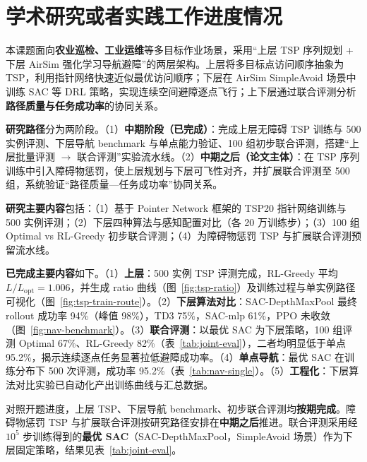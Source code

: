 
\section{学术研究或者实践工作进度情况}

本课题面向\textbf{农业巡检、工业运维}等多目标作业场景，采用``上层 TSP 序列规划 + 下层 AirSim 强化学习导航避障''的两层架构。上层将多目标点访问顺序抽象为 TSP，利用指针网络快速近似最优访问顺序；下层在 AirSim SimpleAvoid 场景中训练 SAC 等 DRL 策略，实现连续空间避障逐点飞行；上下层通过联合评测分析\textbf{路径质量与任务成功率}的协同关系。

\textbf{研究路径}分为两阶段。（1）\textbf{中期阶段（已完成）}：完成上层无障碍 TSP 训练与 500 实例评测、下层导航 benchmark 与单点能力验证、100 组初步联合评测，搭建``上层批量评测 $\to$ 联合评测''实验流水线。（2）\textbf{中期之后（论文主体）}：在 TSP 序列训练中引入障碍物惩罚，使上层规划与下层可飞性对齐，并扩展联合评测至 500 组，系统验证``路径质量—任务成功率''协同关系。

\textbf{研究主要内容}包括：（1）基于 Pointer Network 框架的 TSP20 指针网络训练与 500 实例评测；（2）下层四种算法与感知配置对比（各 20 万训练步）；（3）100 组 Optimal vs RL-Greedy 初步联合评测；（4）为障碍物惩罚 TSP 与扩展联合评测预留流水线。

\textbf{已完成主要内容}如下。（1）\textbf{上层}：500 实例 TSP 评测完成，RL-Greedy 平均 $L/L_{\mathrm{opt}}=1.006$，并生成 ratio 曲线（图~\ref{fig:tsp-ratio}）及训练过程与单实例路径可视化（图~\ref{fig:tsp-train-route}）。（2）\textbf{下层算法对比}：SAC-DepthMaxPool 最终 rollout 成功率 94\%（峰值 98\%），TD3 75\%，SAC-mlp 61\%，PPO 未收敛（图~\ref{fig:nav-benchmark}）。（3）\textbf{联合评测}：以最优 SAC 为下层策略，100 组评测 Optimal 67\%、RL-Greedy 82\%（表~\ref{tab:joint-eval}），二者均明显低于单点 95.2\%，揭示连续逐点任务显著拉低避障成功率。（4）\textbf{单点导航}：最优 SAC 在训练分布下 500 次评测，成功率 95.2\%（表~\ref{tab:nav-single}）。（5）\textbf{工程化}：下层算法对比实验已自动化产出训练曲线与汇总数据。

对照开题进度，上层 TSP、下层导航 benchmark、初步联合评测均\textbf{按期完成}。障碍物惩罚 TSP 与扩展联合评测按研究路径安排在\textbf{中期之后}推进。联合评测采用经 $10^5$ 步训练得到的\textbf{最优 SAC}（SAC-DepthMaxPool，SimpleAvoid 场景）作为下层固定策略，结果见表~\ref{tab:joint-eval}。

